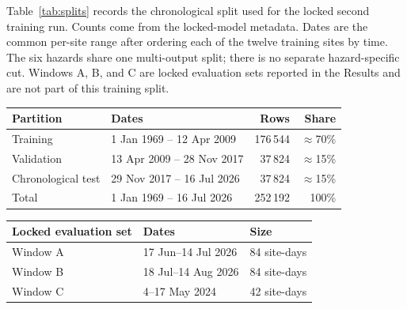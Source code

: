 Table~\ref{tab:splits} records the chronological split used for the locked second training run. Counts come from the locked-model metadata. Dates are the common per-site range after ordering each of the twelve training sites by time. The six hazards share one multi-output split; there is no separate hazard-specific cut. Windows A, B, and C are locked evaluation sets reported in the Results and are not part of this training split.

\begin{center}
\begin{tabular}{@{}llrr@{}}
\toprule
Partition & Dates & Rows & Share \\
\midrule
Training & 1 Jan 1969 -- 12 Apr 2009 & 176\,544 & $\approx$70\% \\
Validation & 13 Apr 2009 -- 28 Nov 2017 & 37\,824 & $\approx$15\% \\
Chronological test & 29 Nov 2017 -- 16 Jul 2026 & 37\,824 & $\approx$15\% \\
\midrule
Total & 1 Jan 1969 -- 16 Jul 2026 & 252\,192 & 100\% \\
\bottomrule
\end{tabular}
\label{tab:splits}
\end{center}

\begin{center}
\begin{tabular}{@{}lll@{}}
\toprule
Locked evaluation set & Dates & Size \\
\midrule
Window A & 17 Jun--14 Jul 2026 & 84 site-days \\
Window B & 18 Jul--14 Aug 2026 & 84 site-days \\
Window C & 4--17 May 2024 & 42 site-days \\
\bottomrule
\end{tabular}
\label{tab:evalwindows}
\end{center}

